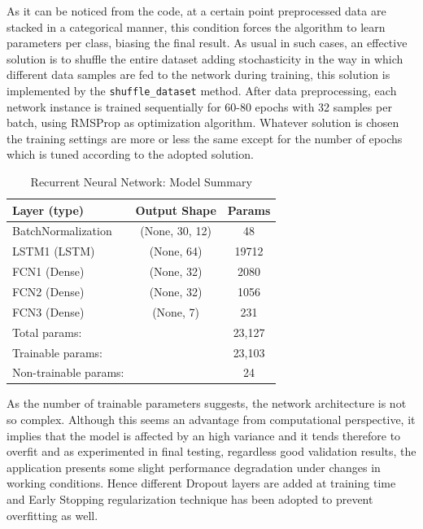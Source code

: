 As it can be noticed from the code, at a certain point preprocessed data are stacked in a categorical manner, this condition forces the algorithm to learn parameters per class, biasing the final result. As usual in such cases, an effective solution is to shuffle the entire dataset adding stochasticity in the way in which different data samples are fed to the network during training, this solution is implemented by the \texttt{shuffle_dataset} method.\newline
After data preprocessing, each network instance is trained sequentially for 60-80 epochs with 32 samples per batch, using RMSProp as optimization algorithm. Whatever solution is chosen the training settings are more or less the same except for the number of epochs which is tuned according to the adopted  solution.

\begin{table}[H]
	\begin{tabular}{||p{5cm}cc||}
		\hline
		Layer (type)      &           Output Shape        &      Params \T\B	\\
		\hline
		\hline
		BatchNormalization    &		  (None, 30, 12)       &     48          \T\B \\
		\hline
		LSTM1 (LSTM)          &       (None, 64)           &     19712     	 \T\B \\
		\hline
		FCN1 (Dense)          &       (None, 32)           &     2080       \T\B \\
		\hline
		FCN2 (Dense)          &       (None, 32)           &     1056      	\T\B \\
		\hline
		FCN3 (Dense)          &       (None, 7)            &     231       \T\B \\ 
		\hline
		\hline
		Total params:   &&										23,127\T  \\
		Trainable params:  && 	  								23,103\\
		Non-trainable params:  && 								24\B  \\
		\hline
		
	\end{tabular}
	\centering
	\caption{\label{tab:2}Recurrent Neural Network: Model Summary}
\end{table}
As the number of trainable parameters suggests, the network architecture is not so complex. Although this seems an advantage from computational perspective, it implies that the model is affected by an high variance and it tends therefore to overfit and as experimented in final testing, regardless good validation results, the application presents some slight performance degradation under changes in working conditions.\newline
Hence different Dropout layers are added at training time and Early Stopping regularization technique has been adopted to prevent overfitting as well.


